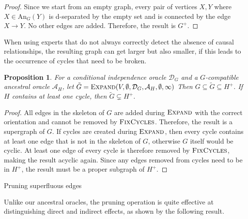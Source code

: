 \documentclass[accepted]{uai2025} %
\newtheorem{proposition}{Proposition}
\begin{document}
\begin{proof}
Since we start from an empty graph, every pair of vertices $X, Y$ where
 $X \in \textrm{An}_G(Y)$ is d-separated by the empty set and is
 connected by the edge $X \to Y$. No other edges are added. Therefore, 
the result is $G^+$. 
\end{proof}

When using experts that do not always correctly detect the absence of 
causal relationships, the resulting graph can get larger but also smaller,
if this leads to the occurrence of cycles that need to be broken.

\begin{proposition}
For a conditional independence oracle
 $\mathcal{D}_G$ and a $G$-compatible ancestral oracle $\mathcal{A}_H$, 
let $\tilde{G}=\textsc{Expand}(V,\emptyset,\mathcal{D}_G,\mathcal{A}_H, \emptyset, \infty)$
Then $G \subseteq \tilde{G} \subseteq H^+$. If $H$ contains at least one cycle, then
$\tilde{G} \subsetneq H^+$.
\label{prop:weakexpand:cyclic}
\end{proposition}

\begin{proof}
All edges in the skeleton of $G$ are added during $\textsc{Expand}$ with the 
correct orientation and cannot be removed by $\textsc{FixCycles}$. Therefore, the result
is a supergraph of $G$. If cycles are created during $\textsc{Expand}$, then every 
cycle contains at least one edge that is not in the skeleton of $G$, otherwise $G$ itself
would be cyclic. At least one edge of every cycle is therefore removed by
 $\textsc{FixCycles}$, making the result acyclic again. Since any edges removed from cycles need
to be in $H^+$, the result must be a proper subgraph of $H^+$.
\end{proof}

\begin{algorithm}[h]
\DontPrintSemicolon
\SetAlgoLined

\caption{Pruning superfluous edges}
\label{algo:prune}
\end{algorithm}

Unlike our ancestral oracles, the pruning operation is 
quite effective at distinguishing
direct and indirect effects, as shown by the following result.
\end{document}
